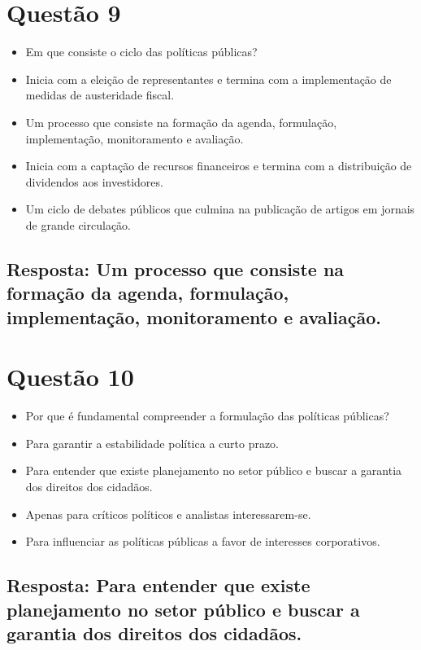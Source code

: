 \documentclass[
   article,       
   12pt,          
   oneside,       
   a4paper,       
   english,       
   brazil,        
   sumario=tradicional
   ]{abntex2}
\begin{document}
\section{Questão 9}
\begin{itemize}
    \item Em que consiste o ciclo das políticas públicas?
    \item Inicia com a eleição de representantes e termina com a implementação de medidas de austeridade fiscal.
    \item Um processo que consiste na formação da agenda, formulação, implementação, monitoramento e avaliação.
    \item Inicia com a captação de recursos financeiros e termina com a distribuição de dividendos aos investidores.
    \item Um ciclo de debates públicos que culmina na publicação de artigos em jornais de grande circulação.
\end{itemize}
\subsection{Resposta: Um processo que consiste na formação da agenda, formulação, implementação, monitoramento e avaliação.}

\section{Questão 10}
\begin{itemize}
    \item Por que é fundamental compreender a formulação das políticas públicas?
    \item Para garantir a estabilidade política a curto prazo.
    \item Para entender que existe planejamento no setor público e buscar a garantia dos direitos dos cidadãos.
    \item Apenas para críticos políticos e analistas interessarem-se.
    \item Para influenciar as políticas públicas a favor de interesses corporativos.
\end{itemize}
\subsection{Resposta: Para entender que existe planejamento no setor público e buscar a garantia dos direitos dos cidadãos.}
\end{document}
